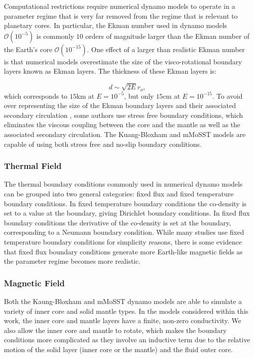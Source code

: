 Computational restrictions require numerical dynamo models to operate in a parameter regime that is very far removed from the regime that is relevant to planetary cores. In particular, the Ekman number used in dynamo models $\mathcal{O}\left( 10^{-5} \right)$ is commonly $10$ orders of magnitude larger than the Ekman number of the Earth's core $\mathcal{O}\left(10^{-15}\right)$. One effect of a larger than realistic Ekman number is that numerical models overestimate the size of the visco-rotational boundary layers known as Ekman layers. The thickness of these Ekman layers is:

\begin{equation}
d\sim \sqrt{2E} r_{o},
\end{equation}
which corresponds to $15$km at $E=10^{-5}$, but only $15$cm at $E=10^{-15}$. To avoid over representing the size of the Ekman boundary layers and their associated secondary circulation \citep{gubbins2007}, some authors \citep{kuangandbloxham1999} use stress free boundary conditions, which eliminates the viscous coupling between the core and the mantle as well as the associated secondary circulation. The Kuang-Bloxham and mMoSST models are capable of using both stress free and no-slip boundary conditions. 

\subsubsection{Thermal Field}
The thermal boundary conditions commonly used in numerical dynamo models can be grouped into two general categories: fixed flux and fixed temperature boundary conditions. In fixed temperature boundary conditions the co-density is set to a value at the boundary, giving Dirichlet boundary conditions. In fixed flux boundary conditions the derivative of the co-density is set at the boundary, corresponding to a Neumann boundary condition. While many studies use fixed temperature boundary conditions for simplicity reasons, there is some evidence \citep{sakuraba2009} that fixed flux boundary conditions generate more Earth-like magnetic fields as the parameter regime becomes more realistic.

\subsubsection{Magnetic Field}
Both the Kaung-Bloxham and mMoSST dynamo models are able to simulate a variety of inner core and solid mantle types. In the models considered within this work, the inner core and mantle layers have a finite, non-zero conductivity. We also allow the inner core and mantle to rotate, which makes the boundary conditions more complicated as they involve an inductive term due to the relative motion of the solid layer (inner core or the mantle) and the fluid outer core.

